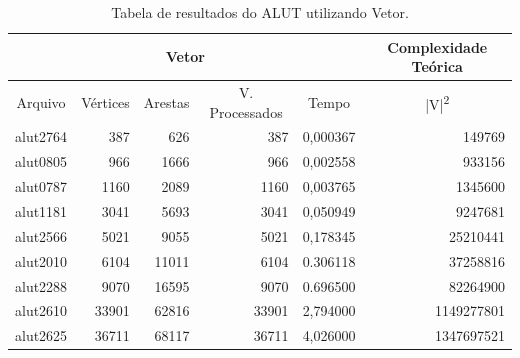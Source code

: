 \documentclass[
	12pt,				%
	oneside,			%
	a4paper,			%
	english,			%
	french,				%
	spanish,			%
	brazil,				%
	]{abntex2}
\begin{document}

\begin{table}[H]
  \centering    
  \begin{tabular}{|c|r|r|r|r|r|}
    \toprule
    \multicolumn{5}{|c|}{\cellcolor{gray!25}\textbf{Vetor}} & \multicolumn{1}{|c|}{\cellcolor{gray!25}\textbf{Complexidade Teórica}}\\
    \midrule
    \multicolumn{1}{|c|}{\cellcolor{gray!10}Arquivo} & \multicolumn{1}{|c|}{\cellcolor{gray!10}Vértices} & \multicolumn{1}{|c|}{\cellcolor{gray!10}Arestas} & \multicolumn{1}{|c|}{\cellcolor{gray!10}V. Processados} & \multicolumn{1}{|c|}{\cellcolor{gray!10}Tempo} & \multicolumn{1}{|c|}{\cellcolor{gray!10}|V|\textsuperscript{2}}\\
    \hline
    alut2764 & 387 & 626 & 387 & 0,000367 & 149769 \\
    \hline
    alut0805 & 966 & 1666 & 966 & 0,002558 & 933156 \\
    \hline
    alut0787 & 1160 & 2089 & 1160 & 0,003765 & 1345600 \\
    \hline
    alut1181 & 3041 & 5693 & 3041 & 0,050949 & 9247681 \\
    \hline
    alut2566 & 5021 & 9055 & 5021 & 0,178345 & 25210441 \\
    \hline
    alut2010 & 6104 & 11011 & 6104 & 0.306118 & 37258816 \\
    \hline
    alut2288 & 9070 & 16595 & 9070 & 0.696500 & 82264900 \\
    \hline
    alut2610 & 33901 & 62816 & 33901 & 2,794000 & 1149277801 \\
    \hline
    alut2625 & 36711 & 68117 & 36711 & 4,026000 & 1347697521 \\
    \hline
  \end{tabular}
  \caption{Tabela de resultados do ALUT utilizando Vetor.}  
  \label{tab:AlutVetor}
\end{table}
\end{document}
